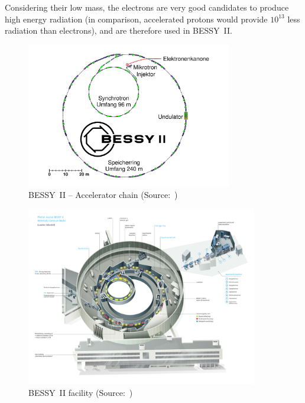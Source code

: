 Considering their low mass, the electrons are very good candidates to produce high energy radiation (in comparison, accelerated protons would provide $10^{13}$ less radiation than electrons), and are therefore used in BESSY~II.

\begin{figure}
    \centering
    \includegraphics[width=0.8\textwidth]{img/bessy_acc_chain_web.jpg}
    \caption[BESSY~II -- Accelerator chain]{\label{fig:bessy_acc_web_simple} BESSY~II -- Accelerator chain (Source:~\cite{web:bessy_homepage})}
\end{figure}

\begin{figure}
    \centering
    \includegraphics[width=0.9\textwidth,height=1\textheight,keepaspectratio]{img/bessy_acc_web.pdf}
    \caption[BESSY~II facility]{\label{fig:bessy_acc_web} BESSY~II facility (Source:~\cite{web:bessy_homepage})}
\end{figure}

